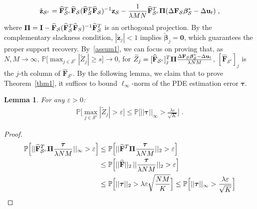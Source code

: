 \documentclass[a4paper,11pt]{article}
\newcommand{\btau}{\bm{\tau}}
\newcommand{\bbeta}{\bm{\beta}}
\newcommand{\bF}{\mathbf{F}}
\newcommand{\mS}{\mathcal{S}}
\newcommand{\bu}{\mathbf{u}}
\newtheorem{lemma}{Lemma}[section]
\begin{document}
\begin{align}
\check{\mathbf{z}}_{\mS^c}=\widehat{\bF}_{\mS^c}^T\widehat{\bF}_\mS(\widehat{\bF}_{\mS}^T\widehat{\bF}_\mS)^{-1}\mathbf{z}_\mS-\frac{1}{\lambda MN}\widehat{\bF}_{\mS^c}^T{\bf{\Pi}}(\Delta \bF_\mS\bbeta_\mS^*-\Delta \bu_t)\;,\label{zSc}
\end{align}
where ${\bf{\Pi}}={\bf{I}}-\widehat{\bF}_\mS(\widehat{\bF}_\mS^T\widehat{\bF}_S)^{-1}\widehat{\bF}_\mS^T$ is an orthogonal projection. By the complementary slackness condition,  $|\check{\mathbf{z}}_j|< 1$ implies $\check{\bbeta}_j=\mathbf{0}$, which guarantees the proper support recovery. By~\eqref{assum1}, we can focus on proving that, as $N,M\to \infty$, $
\mathbb{P}\big[\max_{j\in \mS^c}|\widetilde{Z}_j|\geq s\big]\to 0$, for $\widetilde{Z}_j = [\widehat{\bF}_{\mS^c}]^T_j{\bf\Pi}\frac{\Delta \bF_\mS\bbeta_\mS^*-\Delta \bu_t}{\lambda NM}$, $[\widehat{\bF}_{\mS^c}]_j$ is the $j$-th column of $\widehat{\bF}_{\mS^c}$. By the following lemma, we claim that to prove Theorem~\ref{thm1}, it suffices to bound $\ell_\infty$-norm of the PDE estimation error $\btau$.
\begin{lemma}\label{Zlemma}
For any $\varepsilon>0$:
\begin{align}
\mathbb{P}\big[\max_{j\in \mS^c}|\widetilde{Z}_j|>\varepsilon\big]\leq  \mathbb{P}\Big[||\btau||_\infty>\frac{\lambda\varepsilon}{\sqrt{K}}\Big]\;.\label{ZlemmaBound}
\end{align}
\end{lemma}
\begin{proof}
	\begin{align*}
	\mathbb{P}\Big[||\widehat{\bF}_{\mS^c}^T{\bf\Pi}\frac{\btau}{\lambda NM}||_\infty>\varepsilon\Big]&\leq\mathbb{P}\Big[||\widehat{\bF}^T{\bf\Pi}\frac{\btau}{\lambda NM}||_2>\varepsilon\Big]\\
	&\leq\mathbb{P}\Big[||\widehat{\bF}||_2\,||\frac{\btau}{\lambda NM}||_2>\varepsilon\Big]\\
	&\leq \mathbb{P}\Big[||\btau||_2>\lambda \varepsilon\sqrt{\frac{NM}{K}}\Big]\leq \mathbb{P}\Big[||\btau||_\infty>\frac{\lambda\varepsilon}{\sqrt{K}}\Big]
	\end{align*}
\end{proof}
\end{document}
